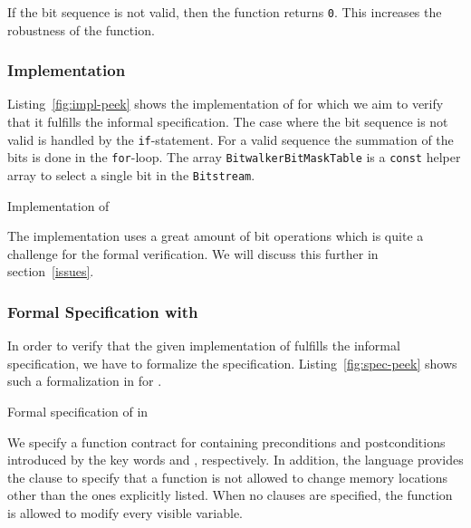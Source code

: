If the bit sequence is not valid, then the function returns \texttt{0}.
This increases the robustness of the function.

\subsubsection{Implementation}
\label{impl-peek}
 
Listing~\ref{fig:impl-peek} shows the \isoc implementation of \peek 
for which we aim to verify that it fulfills the informal specification.
The case where the bit sequence is not valid is handled by the \texttt{if}-statement.
For a valid sequence the summation of the bits is done in the \texttt{for}-loop.
The array \texttt{BitwalkerBitMaskTable} is a \texttt{const} helper array 
to select a single bit in the \texttt{Bitstream}.

\begin{listing}[hbt]
\begin{minipage}{\textwidth}

\end{minipage}
\caption{\label{fig:impl-peek} Implementation of \peek}
\end{listing}

The implementation uses a great amount of bit operations
which is quite a challenge for the formal verification.
We will discuss this further in section~\ref{issues}.

\FloatBarrier
\clearpage

\subsubsection{Formal Specification with \acsl}
\label{formal-peek}

In order to verify that the given implementation of \peek fulfills 
the informal specification, we have to formalize the specification.
Listing~\ref{fig:spec-peek} shows such a formalization in \acsl for \peek.

\begin{listing}[hbt]
\begin{minipage}{\textwidth}

\end{minipage}
\caption{\label{fig:spec-peek} Formal specification of \peek in \acsl}
\end{listing}

We specify a function contract for \peek containing preconditions
and postconditions introduced by the key words 
and , respectively.
In addition, the \acsl language provides the  clause to specify 
that a function is not allowed to change memory locations other than the ones 
explicitly listed. 
When no  clauses are specified, 
the function is allowed to modify every visible variable. 

